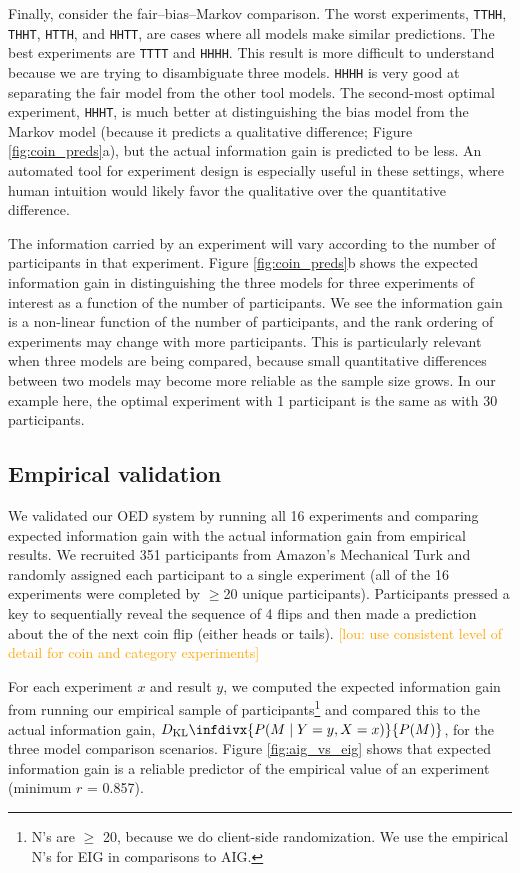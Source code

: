 \documentclass{article}
\newcommand{\dkl}{D_\mathrm{KL}\infdivx}
\newcommand{\lou}[1]{\textcolor{orange}{[lou: #1]}}
\begin{document}
Finally, consider the fair--bias--Markov comparison.
The worst experiments, \lstinline{TTHH}, \lstinline{THHT}, \lstinline{HTTH}, and \lstinline{HHTT}, are cases where all models make similar predictions.
The best experiments are \lstinline{TTTT} and \lstinline{HHHH}.
This result is more difficult to understand because we are trying to disambiguate three models.
\lstinline{HHHH} is very good at separating the fair model from the other tool models.
The second-most optimal experiment, \lstinline{HHHT}, is much better at distinguishing the bias model from the Markov model (because it predicts a qualitative difference; Figure \ref{fig:coin_preds}a), but the actual information gain is predicted to be less.
An automated tool for experiment design is especially useful in these settings, where human intuition would likely favor the qualitative over the quantitative difference.

The information carried by an experiment will vary according to the number of participants in that experiment.
Figure \ref{fig:coin_preds}b shows the expected information gain in distinguishing the three models for three experiments of interest as a function of the number of participants.
We see the information gain is a non-linear function of the number of participants, and the rank ordering of experiments may change with more participants.
This is particularly relevant when three models are being compared, because small quantitative differences between two models may become more reliable as the sample size grows.
In our example here, the optimal experiment with 1 participant is the same as with 30 participants.


\subsection{Empirical validation}
We validated our OED system by running all 16 experiments and comparing expected information gain with the actual information gain from empirical results.
We recruited 351 participants from Amazon's Mechanical Turk and randomly assigned each participant to a single experiment (all of the 16 experiments were completed by $\geq$20 unique participants).
Participants pressed a key to sequentially reveal the sequence of 4 flips and then made a prediction about the of the next coin flip (either heads or tails).
\lou{use consistent level of detail for coin and category experiments}

For each experiment $x$ and result $y$, we computed the expected information gain from running our empirical sample of participants\footnote{N's are $\geq$ 20, because we do client-side randomization. We use the empirical N's for EIG in comparisons to AIG.} and compared this to the actual information gain, $\dkl{P(M \mid Y = y, X = x)}{P(M)}$, for the three model comparison scenarios.
Figure \ref{fig:aig_vs_eig} shows that expected information gain is a reliable predictor of the empirical value of an experiment (minimum $r$ = 0.857).
\end{document}
